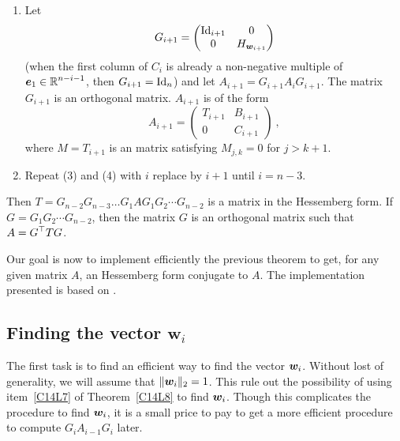 \begin{algo}
\begin{enumerate}
$\DS \VEC{w}_{i+1} \in \RR^{n-i-1}$ such that
$H_{\VEC{w}_{i+1}}$ maps the first column of $C_i$ to a multiple of
$\VEC{e}_1$ in $\DS \RR^{n-i-1}$.  If the first
column of $C_i$ is already a non-negative multiple of
$\DS \VEC{e}_1 \in \RR^{n-i-1}$, take $\VEC{w}_{i+1} = \VEC{0}$.
\item Let
\[
G_{i+1} = \begin{pmatrix}
\operatorname{Id}_{i+1} & 0 \\
0 & H_{\bm{w}_{i+1}}
\end{pmatrix}
\]
(when the first column of $C_i$ is already a non-negative
multiple of $\DS \VEC{e}_1 \in \RR^{n-i-1}$, then
$G_{i+1} = \operatorname{Id}_n$) and let
$A_{i+1} = G_{i+1} A_i G_{i+1}$.  The matrix $G_{i+1}$ is an orthogonal
matrix.  $A_{i+1}$ is of the form
\[
A_{i+1} =
\begin{pmatrix}
T_{i+1} & B_{i+1} \\
0 & C_{i+1}
\end{pmatrix} \ ,
\]
where $M=T_{i+1}$ is an  matrix satisfying $M_{j,k} = 0$
for $j > k+1$.
\item Repeat (3) and (4) with $i$ replace by $i+1$ until $i=n-3$.
\end{enumerate}
Then $T=G_{n-2} G_{n-3} \ldots G_1 A G_1 G_2 \cdots G_{n-2}$ is a matrix 
in the Hessemberg form.  If $G = G_1 G_2 \cdots G_{n-2}$, then the matrix $G$
is an orthogonal matrix such that $\displaystyle A = G^\top T G$.
\label{C14L10}
\end{algo}

Our goal is now to implement efficiently the previous theorem to get, for any
given matrix $A$, an Hessemberg form conjugate to $A$.  The implementation
presented is based on \cite{BT}.

\subsection{Finding the vector $\mathbf{w}_i$}

The first task is to find an efficient way to find the vector $\bm{w}_i$.
Without lost of generality, we will assume that $\|\bm{w}_i\|_2 = 1$.
This rule out the possibility of using item~\ref{C14L7} of
Theorem~\ref{C14L8} to find $\bm{w}_i$.  Though this complicates
the procedure to find $\bm{w}_i$, it is a small price to pay to get a
more efficient procedure to compute $G_i A_{i-1} G_i$ later.

